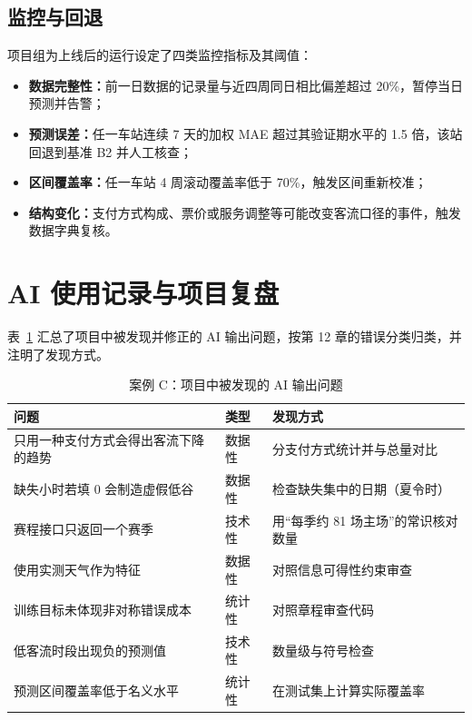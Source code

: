 \subsection{监控与回退}

项目组为上线后的运行设定了四类监控指标及其阈值：

\begin{itemize}
  \item \textbf{数据完整性：}前一日数据的记录量与近四周同日相比偏差超过 20\%，暂停当日预测并告警；
  \item \textbf{预测误差：}任一车站连续 7 天的加权 MAE 超过其验证期水平的 1.5 倍，该站回退到基准 B2 并人工核查；
  \item \textbf{区间覆盖率：}任一车站 4 周滚动覆盖率低于 70\%，触发区间重新校准；
  \item \textbf{结构变化：}支付方式构成、票价或服务调整等可能改变客流口径的事件，触发数据字典复核。
\end{itemize}

\section{AI 使用记录与项目复盘}

表~\ref{tab:ch16_ai_errors} 汇总了项目中被发现并修正的 AI 输出问题，按第 12 章的错误分类归类，并注明了发现方式。

\begin{table}[H]
\centering
\caption{案例 C：项目中被发现的 AI 输出问题}
\label{tab:ch16_ai_errors}
\small
\begin{tabular}{p{5.2cm}p{1.6cm}p{5.6cm}}
\toprule
问题 & 类型 & 发现方式 \\
\midrule
只用一种支付方式会得出客流下降的趋势 & 数据性 & 分支付方式统计并与总量对比 \\
缺失小时若填 0 会制造虚假低谷 & 数据性 & 检查缺失集中的日期（夏令时） \\
赛程接口只返回一个赛季 & 技术性 & 用“每季约 81 场主场”的常识核对数量 \\
使用实测天气作为特征 & 数据性 & 对照信息可得性约束审查 \\
训练目标未体现非对称错误成本 & 统计性 & 对照章程审查代码 \\
低客流时段出现负的预测值 & 技术性 & 数量级与符号检查 \\
预测区间覆盖率低于名义水平 & 统计性 & 在测试集上计算实际覆盖率 \\
\bottomrule
\end{tabular}
\end{table}

